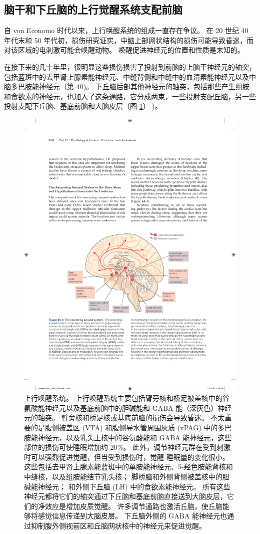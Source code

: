 \subsection{脑干和下丘脑的上行觉醒系统支配前脑}

自 von Economo 时代以来，上行唤醒系统的组成一直存在争议。
在 20 世纪 40 年代末和 50 年代初，损伤研究证实，中脑上部网状结构的损伤可能导致昏迷，而对该区域的电刺激可能会唤醒动物。
唤醒促进神经元的位置和性质是未知的。


在接下来的几十年里，很明显这些损伤损害了投射到前脑的上脑干神经元的轴突，包括蓝斑中的去甲肾上腺素能神经元、中缝背侧和中缝中的血清素能神经元以及中脑多巴胺能神经元（第 40)。
下丘脑后部其他神经元的轴突，包括那些产生组胺和食欲素的神经元，也加入了这条通路，它分成两束，一些投射支配丘脑，另一些投射支配下丘脑、基底前脑和大脑皮层（图 \ref{fig:44_3}） )。


\begin{figure}[htbp]
	\centering
	\includegraphics[width=0.75\linewidth]{chap44/fig_44_3}
	\caption{上行唤醒系统。 上行唤醒系统主要包括臂旁核和桥足被盖核中的谷氨酸能神经元以及基底前脑中的胆碱能和 GABA 能（深灰色）神经元的轴突。 臂旁核和桥足核或基底前脑的损伤会导致昏迷。 不太重要的是腹侧被盖区 (VTA) 和腹侧导水管周围灰质 (vPAG) 中的多巴胺能神经元，以及乳头上核中的谷氨酸能和 GABA 能神经元，这些部位的损伤可使睡眠增加约 20\%。 此外，调节神经元群在受到刺激时可以强烈促进觉醒，但当受到损伤时，觉醒-睡眠量的变化很小。 这些包括去甲肾上腺素能蓝斑中的单胺能神经元、5-羟色胺能背核和中缝核，以及组胺能结节乳头核； 脚桥脑和外侧背侧被盖核中的胆碱能神经元； 和外侧下丘脑 (LH) 中的食欲素能神经元。 所有这些神经元都将它们的轴突通过下丘脑和基底前脑直接送到大脑皮层，它们的净效应是增加皮质觉醒。 许多调节通路也激活丘脑，使丘脑能够将感觉信息传递到大脑皮层。 下丘脑外侧的 GABA 能神经元也通过抑制腹外侧视前区和丘脑网状核中的神经元来促进觉醒。}
	\label{fig:44_3}
\end{figure}


